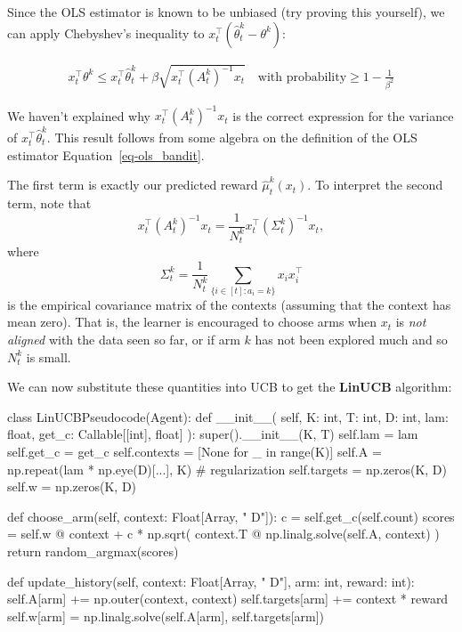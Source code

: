 \documentclass[
  letterpaper,
  DIV=11,
  numbers=noendperiod]{scrreprt}
\newenvironment{Shaded}{\begin{snugshade}}{\end{snugshade}}
\newcommand{\NormalTok}[1]{\textcolor[rgb]{0.00,0.23,0.31}{#1}}
\theoremstyle{plain}
\theoremstyle{plain}
\theoremstyle{definition}
\theoremstyle{definition}
\theoremstyle{remark}
\begin{document}
Since the OLS estimator is known to be unbiased (try proving this
yourself), we can apply Chebyshev's inequality to
\(x_t^\top (\hat \theta_t^k - \theta^k)\):

\[\begin{aligned}
    x_t^\top \theta^k \le x_t^\top \hat \theta_t^k + \beta \sqrt{x_t^\top (A_t^k)^{-1} x_t} \quad \text{with probability} \ge 1 - \frac{1}{\beta^2}
\end{aligned}\]

We haven't explained why \(x_t^\top (A_t^k)^{-1} x_t\) is the correct
expression for the variance of \(x_t^\top \hat \theta_t^k\). This result
follows from some algebra on the definition of the OLS estimator
Equation~\ref{eq-ols_bandit}.

The first term is exactly our predicted reward \(\hat \mu^k_t(x_t)\). To
interpret the second term, note that
\[x_t^\top (A_t^k)^{-1} x_t = \frac{1}{N_t^k} x_t^\top (\Sigma_t^k)^{-1} x_t,\]
where
\[\Sigma_t^k = \frac{1}{N_t^k} \sum_{\{ i \in [t] : a_i = k \}} x_i x_i^\top\]
is the empirical covariance matrix of the contexts (assuming that the
context has mean zero). That is, the learner is encouraged to choose
arms when \(x_t\) is \emph{not aligned} with the data seen so far, or if
arm \(k\) has not been explored much and so \(N_t^k\) is small.

We can now substitute these quantities into UCB to get the
\textbf{LinUCB} algorithm:

\begin{Shaded}
\begin{Highlighting}[]
\NormalTok{class LinUCBPseudocode(Agent):}
\NormalTok{    def \_\_init\_\_(}
\NormalTok{        self, K: int, T: int, D: int, lam: float, get\_c: Callable[[int], float]}
\NormalTok{    ):}
\NormalTok{        super().\_\_init\_\_(K, T)}
\NormalTok{        self.lam = lam}
\NormalTok{        self.get\_c = get\_c}
\NormalTok{        self.contexts = [None for \_ in range(K)]}
\NormalTok{        self.A = np.repeat(lam * np.eye(D)[...], K)  \# regularization}
\NormalTok{        self.targets = np.zeros(K, D)}
\NormalTok{        self.w = np.zeros(K, D)}

\NormalTok{    def choose\_arm(self, context: Float[Array, " D"]):}
\NormalTok{        c = self.get\_c(self.count)}
\NormalTok{        scores = self.w @ context + c * np.sqrt(}
\NormalTok{            context.T @ np.linalg.solve(self.A, context)}
\NormalTok{        )}
\NormalTok{        return random\_argmax(scores)}

\NormalTok{    def update\_history(self, context: Float[Array, " D"], arm: int, reward: int):}
\NormalTok{        self.A[arm] += np.outer(context, context)}
\NormalTok{        self.targets[arm] += context * reward}
\NormalTok{        self.w[arm] = np.linalg.solve(self.A[arm], self.targets[arm])}
\end{Highlighting}
\end{Shaded}
\end{document}
